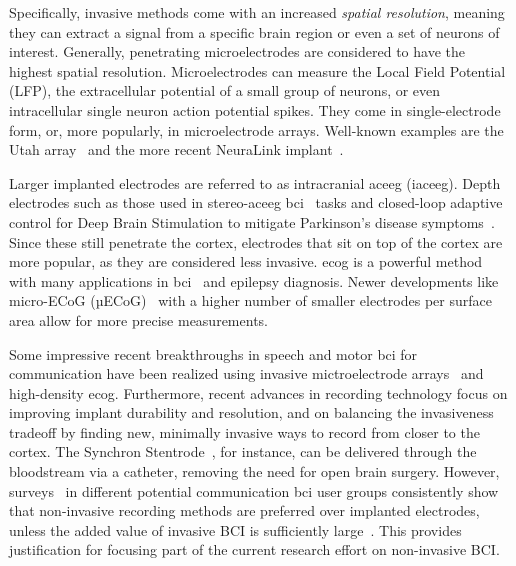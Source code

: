 Specifically, invasive methods come with an increased \emph{spatial resolution},
meaning they can extract a signal from a specific brain region or even a set of
neurons of interest.
Generally, penetrating microelectrodes are considered to have the highest
spatial resolution.
Microelectrodes can measure the Local Field Potential (LFP), the extracellular
potential of a small group of neurons, or even intracellular single neuron
action potential spikes.
They come in single-electrode form, or, more popularly, in microelectrode
arrays.
Well-known examples are the Utah array~\cite{Maynard1997} and the more recent
NeuraLink implant~\cite{Musk2019}.

Larger implanted electrodes are referred to as intracranial ac{eeg} (iac{eeg}).
Depth electrodes such as those used in stereo-ac{eeg} \ac{bci}~\cite{Wu2024} tasks
and closed-loop adaptive control for Deep Brain Stimulation to mitigate
Parkinson's disease symptoms~\cite{Arlotti2018}.
Since these still penetrate the cortex, electrodes that sit on top of the
cortex are more popular, as they are considered less invasive.
\Ac{ecog} is a powerful method
with many applications in \ac{bci}~\cite{Schalk2011} and epilepsy diagnosis.
Newer developments like micro-ECoG (µECoG)~\cite{Shokoueinejad2019} with a
higher number of smaller electrodes per surface area allow for more precise
measurements.

Some impressive recent breakthroughs in speech and motor \ac{bci} for communication
 have been realized using
invasive mictroelectrode arrays~\cite{Willett2021} and high-density
\Ac{ecog}\cite{Metzger2023}.
Furthermore, recent advances in recording technology focus on improving implant
durability and resolution, and on balancing the invasiveness
tradeoff by finding new, minimally invasive ways to record from closer to the cortex.
The Synchron Stentrode~\cite{Mitchell2023}, for instance, can be delivered
through the bloodstream via a catheter, removing the need for open brain
surgery.
However, surveys~\cite{Huggins2011, Huggins2015, Branco2021} in different
potential communication \ac{bci} user groups consistently show that non-invasive
recording methods are preferred over implanted electrodes, unless the added value of invasive BCI is
sufficiently large~\cite{Kageyama2020}.
This provides justification for focusing part of the current research effort on
non-invasive BCI.

